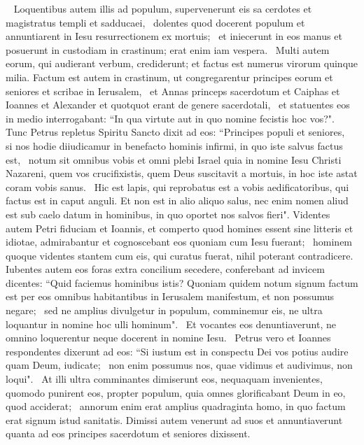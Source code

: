 \begin{biblechapter}  
\verse Loquentibus autem illis ad populum, supervenerunt eis sa cerdotes et magistratus templi et sadducaei,  
\verse dolentes quod docerent populum et annuntiarent in Iesu resurrectionem ex mortuis;  
\verse et iniecerunt in eos manus et posuerunt in custodiam in crastinum; erat enim iam vespera.  
\verse Multi autem eorum, qui audierant verbum, crediderunt; et factus est numerus virorum quinque milia. 
\verse Factum est autem in crastinum, ut congregarentur principes eorum et seniores et scribae in Ierusalem,  
\verse et Annas princeps sacerdotum et Caiphas et Ioannes et Alexander et quotquot erant de genere sacerdotali,  
\verse et statuentes eos in medio interrogabant: “In qua virtute aut in quo nomine fecistis hoc vos?".  
\verse Tunc Petrus repletus Spiritu Sancto dixit ad eos: “Principes populi et seniores,  
\verse si nos hodie diiudicamur in benefacto hominis infirmi, in quo iste salvus factus est,  
\verse notum sit omnibus vobis et omni plebi Israel quia in nomine Iesu Christi Nazareni, quem vos crucifixistis, quem Deus suscitavit a mortuis, in hoc iste astat coram vobis sanus.  
\verse Hic est lapis, qui reprobatus est a vobis aedificatoribus, qui factus est in caput anguli. 
\verse Et non est in alio aliquo salus, nec enim nomen aliud est sub caelo datum in hominibus, in quo oportet nos salvos fieri". 
\verse Videntes autem Petri fiduciam et Ioannis, et comperto quod homines essent sine litteris et idiotae, admirabantur et cognoscebant eos quoniam cum Iesu fuerant;  
\verse hominem quoque videntes stantem cum eis, qui curatus fuerat, nihil poterant contradicere.  
\verse Iubentes autem eos foras extra concilium secedere, conferebant ad invicem  
\verse dicentes: “Quid faciemus hominibus istis? Quoniam quidem notum signum factum est per eos omnibus habitantibus in Ierusalem manifestum, et non possumus negare;  
\verse sed ne amplius divulgetur in populum, comminemur eis, ne ultra loquantur in nomine hoc ulli hominum".  
\verse Et vocantes eos denuntiaverunt, ne omnino loquerentur neque docerent in nomine Iesu.  
\verse Petrus vero et Ioannes respondentes dixerunt ad eos: “Si iustum est in conspectu Dei vos potius audire quam Deum, iudicate;  
\verse non enim possumus nos, quae vidimus et audivimus, non loqui".  
\verse At illi ultra comminantes dimiserunt eos, nequaquam invenientes, quomodo punirent eos, propter populum, quia omnes glorificabant Deum in eo, quod acciderat;  
\verse annorum enim erat amplius quadraginta homo, in quo factum erat signum istud sanitatis. 
\verse Dimissi autem venerunt ad suos et annuntiaverunt quanta ad eos principes sacerdotum et seniores dixissent.  

\end{biblechapter}
